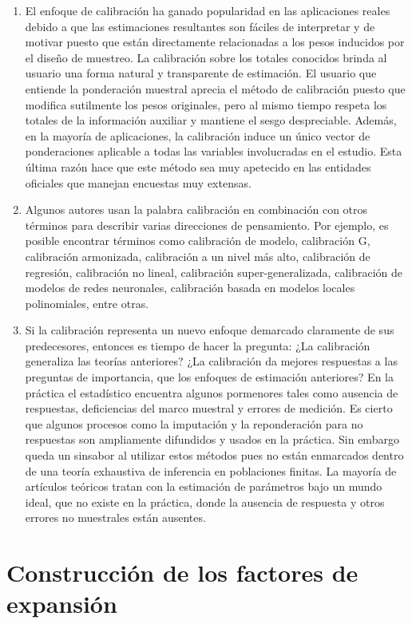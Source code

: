 \documentclass[
  10pt,
  spanish,
]{book}
\begin{document}
\begin{enumerate}
\item
  El enfoque de calibración ha ganado popularidad en las aplicaciones reales debido a que las estimaciones resultantes son fáciles de interpretar y de motivar puesto que están directamente relacionadas a los pesos inducidos por el diseño de muestreo. La calibración sobre los totales conocidos brinda al usuario una forma natural y transparente de estimación. El usuario que entiende la ponderación muestral aprecia el método de calibración puesto que modifica sutilmente los pesos originales, pero al mismo tiempo respeta los totales de la información auxiliar y mantiene el sesgo despreciable. Además, en la mayoría de aplicaciones, la calibración induce un único vector de ponderaciones aplicable a todas las variables involucradas en el estudio. Esta última razón hace que este método sea muy apetecido en las entidades oficiales que manejan encuestas muy extensas.
\item
  Algunos autores usan la palabra calibración en combinación con otros términos para describir varias direcciones de pensamiento. Por ejemplo, es posible encontrar términos como calibración de modelo, calibración G, calibración armonizada, calibración a un nivel más alto, calibración de regresión, calibración no lineal, calibración super-generalizada, calibración de modelos de redes neuronales, calibración basada en modelos locales polinomiales, entre otras.
\item
  Si la calibración representa un nuevo enfoque demarcado claramente de sus predecesores, entonces es tiempo de hacer la pregunta: ¿La calibración generaliza las teorías anteriores? ¿La calibración da mejores respuestas a las preguntas de importancia, que los enfoques de estimación anteriores? En la práctica el estadístico encuentra algunos pormenores tales como ausencia de respuestas, deficiencias del marco muestral y errores de medición. Es cierto que algunos procesos como la imputación y la reponderación para no respuestas son ampliamente difundidos y usados en la práctica. Sin embargo queda un sinsabor al utilizar estos métodos pues no están enmarcados dentro de una teoría exhaustiva de inferencia en poblaciones finitas. La mayoría de artículos teóricos tratan con la estimación de parámetros bajo un mundo ideal, que no existe en la práctica, donde la ausencia de respuesta y otros errores no muestrales están ausentes.
\end{enumerate}

\hypertarget{construcciuxf3n-de-los-factores-de-expansiuxf3n}{%
\chapter{Construcción de los factores de expansión}\label{construcciuxf3n-de-los-factores-de-expansiuxf3n}}
\end{document}
